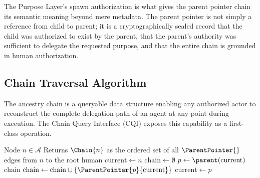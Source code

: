 The Purpose Layer's spawn authorization is what gives the parent pointer chain its semantic meaning beyond mere metadata. The parent pointer is not simply a reference from child to parent; it is a cryptographically sealed record that the child was authorized to exist by the parent, that the parent's authority was sufficient to delegate the requested purpose, and that the entire chain is grounded in human authorization.

\subsection{Chain Traversal Algorithm}
\label{sec:chain_traversal_algorithm}

The ancestry chain is a queryable data structure enabling any authorized actor to reconstruct the complete delegation path of an agent at any point during execution. The Chain Query Interface (CQI) exposes this capability as a first-class operation.

\begin{algorithm}[htbp]
\caption{Chain-Traverse($n$)}
\label{alg:chain_traverse}
\begin{algorithmic}[1]
\Require Node $n \in \mathcal{A}$
\Ensure Returns $\Chain{n}$ as the ordered set of all $\ParentPointer{}$ edges from $n$ to the root human
\State $\text{current} \gets n$
\State $\text{chain} \gets \emptyset$
\Loop
    \State $p \gets \parent(\text{current})$
        \State \Return $\text{chain}$ 
    \EndIf
    \State $\text{chain} \gets \text{chain} \cup \{\ParentPointer{p}{\text{current}}\}$
    \State $\text{current} \gets p$
\EndLoop
\end{algorithmic}
\end{algorithm}

